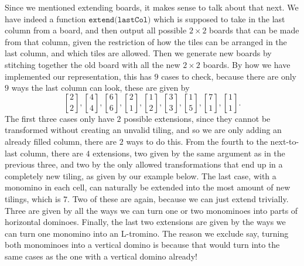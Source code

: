 \documentclass[11pt,a4paper]{article}
\newcommand{\col}{\genfrac{[}{]}{0pt}{}}
\begin{document}
Since we mentioned extending boards, it makes sense to talk about that next. We
have indeed a function $\texttt{extend(lastCol)}$ which is
supposed to take in the last column from a board, and then output all possible
$2\times 2$ boards that can be made from that column, given the restriction of
how the tiles can be arranged in the last column, and which tiles are allowed.
 Then we generate new boards by stitching together the old board with all the new $2\times 2$ boards.
By how we have implemented our representation, this has $9$ cases to check,
because there are only $9$ ways the last column can look, these are given by
\[
\col{2}{2}, \col{4}{4}, \col{6}{6}, \col{2}{1}, \col{1}{2},  \col{3}{3}, \col{1}{5}, \col{7}{1}, \col{1}{1}.
\] 
The first three cases only have $2$ possible extensions, since they cannot be
transformed without creating an unvalid tiling, and so we are only adding an
already filled column, there are $2$ ways to do this. From the fourth to the
next-to-last column, there are $4$ extensions, two given by the same argument
as in the previous three, and two by the only allowed transformations that end
up in a completely new tiling, as given by our example below. The last case,
with a monomino in each cell, can naturally be extended into the most amount of
new tilings, which is $7$. Two of these are again, because we can just extend
trivially. Three are given by all the ways we can turn one or two monominoes
into parts of horizontal dominoes. Finally, the last two extensions are given by the
 ways we can turn one monomino into an L-tromino. The reason we exclude say,
turning both monominoes into a vertical domino is because that would turn into
the same cases as the one with a vertical domino already! 
\end{document}
